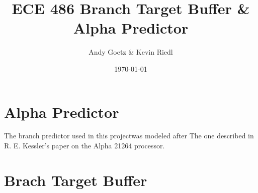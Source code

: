 \documentclass[titlepage]{article}
\author{\LARGE Andy Goetz \& Kevin Riedl}
\date{\today}
\title{\Huge \textbf{ECE 486 Branch Target Buffer \& Alpha Predictor}}
\begin{document}
\maketitle
\section{Alpha Predictor}
The branch predictor used in this projectwas modeled after
The one described in R. E. Kessler's paper on the Alpha 
21264 processor.

\section{Brach Target Buffer}
\end{document}
